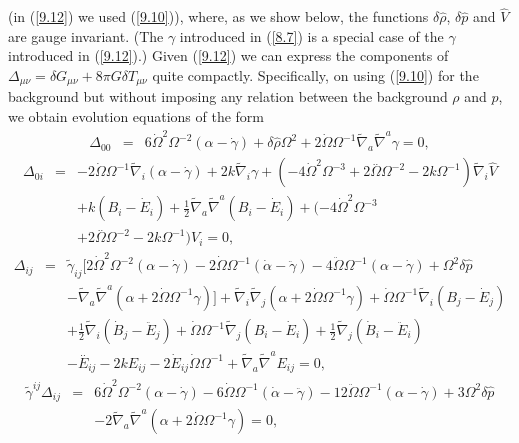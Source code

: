 %
(in (\ref{9.12}) we used (\ref{9.10})), where, as we show below, the functions $\delta \hat{\rho}$, $\delta \hat{p}$ and $\hat{V} $ are gauge invariant. (The $\gamma$ introduced in (\ref{8.7}) is a special case of the $\gamma$ introduced in (\ref{9.12}).) Given (\ref{9.12}) we can express the components of $\Delta_{\mu\nu}=\delta G_{\mu\nu}+8\pi G\delta T_{\mu\nu}$ quite compactly. Specifically,  on using (\ref{9.10}) for the background but without imposing any relation between the background $\rho$ and $p$, we obtain evolution equations of the form 
%
\begin{eqnarray}
\Delta_{00}&=& 6 \dot{\Omega}^2 \Omega^{-2}(\alpha-\dot\gamma) + \delta \hat{\rho} \Omega^2 + 2 \dot{\Omega} \Omega^{-1} \tilde{\nabla}_{a}\tilde{\nabla}^{a}\gamma=0, 
\label{9.13}
\end{eqnarray}
%
%
\begin{eqnarray}
\Delta_{0i}&=& -2 \dot{\Omega} \Omega^{-1} \tilde{\nabla}_{i}(\alpha - \dot\gamma) + 2 k \tilde{\nabla}_{i}\gamma 
+(-4 \dot{\Omega}^2 \Omega^{-3}  + 2 \overset{..}{\Omega} \Omega^{-2}  - 2 k \Omega^{-1}) \tilde{\nabla}_{i}\hat{V}
\nonumber\\
&& +k(B_i-\dot E_i)+ \tfrac{1}{2} \tilde{\nabla}_{a}\tilde{\nabla}^{a}(B_{i} - \dot{E}_{i})
+ (-4 \dot{\Omega}^2 \Omega^{-3} 
\nonumber\\
&&+ 2 \overset{..}{\Omega} \Omega^{-2} - 2 k \Omega^{-1})V_{i}=0,
\label{9.14}
\end{eqnarray}
%
%
\begin{eqnarray}
\Delta_{ij}&=& \tilde{\gamma}_{ij}\big[ 2 \dot{\Omega}^2 \Omega^{-2}(\alpha-\dot\gamma)
-2  \dot{\Omega} \Omega^{-1}(\dot\alpha -\ddot\gamma)-4\ddot\Omega\Omega^{-1}(\alpha-\dot\gamma)
+ \Omega^2 \delta \hat{p}
\nonumber\\
&&-\tilde\nabla_a\tilde\nabla^a( \alpha + 2\dot\Omega \Omega^{-1}\gamma) \big] 
+\tilde\nabla_i\tilde\nabla_j( \alpha + 2\dot\Omega \Omega^{-1}\gamma)
+\dot{\Omega} \Omega^{-1} \tilde{\nabla}_{i}(B_{j}-\dot E_j)
\nonumber\\
&&+\tfrac{1}{2} \tilde{\nabla}_{i}(\dot{B}_{j}-\ddot{E}_j)
+\dot{\Omega} \Omega^{-1} \tilde{\nabla}_{j}(B_{i}-\dot E_i)+\tfrac{1}{2} \tilde{\nabla}_{j}(\dot{B}_{i}-\ddot{E}_i)
\nonumber\\
&&- \overset{..}{E}_{ij} - 2 k E_{ij} - 2 \dot{E}_{ij} \dot{\Omega} \Omega^{-1} + \tilde{\nabla}_{a}\tilde{\nabla}^{a}E_{ij}=0,
\label{9.15}
\end{eqnarray}
%
%
\begin{eqnarray}
\tilde{\gamma}^{ij}\Delta_{ij} &=&  6 \dot{\Omega}^2 \Omega^{-2}(\alpha-\dot\gamma)
-6  \dot{\Omega} \Omega^{-1}(\dot\alpha -\ddot\gamma)-12\ddot\Omega\Omega^{-1}(\alpha-\dot\gamma)+ 3\Omega^2 \delta \hat{p}
\nonumber\\
&&-2\tilde\nabla_a\tilde\nabla^a( \alpha + 2\dot\Omega \Omega^{-1}\gamma)=0,
\label{9.16}
\end{eqnarray}
